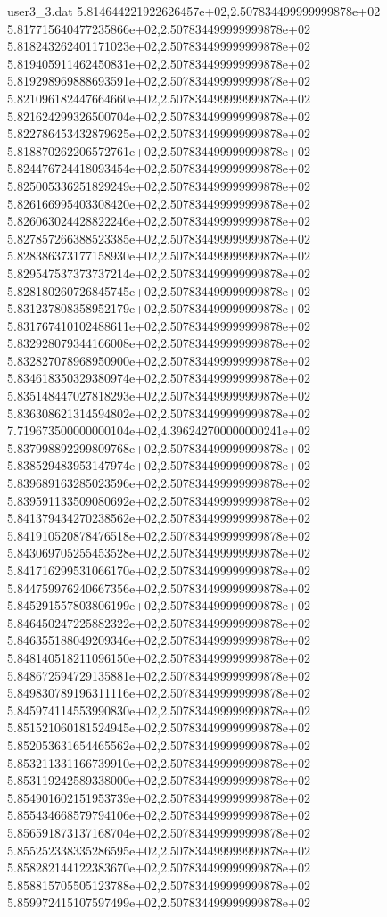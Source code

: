\begin{filecontents}{user3_3.dat}
5.814644221922626457e+02,2.507834499999999878e+02
5.817715640477235866e+02,2.507834499999999878e+02
5.818243262401171023e+02,2.507834499999999878e+02
5.819405911462450831e+02,2.507834499999999878e+02
5.819298969888693591e+02,2.507834499999999878e+02
5.821096182447664660e+02,2.507834499999999878e+02
5.821624299326500704e+02,2.507834499999999878e+02
5.822786453432879625e+02,2.507834499999999878e+02
5.818870262206572761e+02,2.507834499999999878e+02
5.824476724418093454e+02,2.507834499999999878e+02
5.825005336251829249e+02,2.507834499999999878e+02
5.826166995403308420e+02,2.507834499999999878e+02
5.826063024428822246e+02,2.507834499999999878e+02
5.827857266388523385e+02,2.507834499999999878e+02
5.828386373177158930e+02,2.507834499999999878e+02
5.829547537373737214e+02,2.507834499999999878e+02
5.828180260726845745e+02,2.507834499999999878e+02
5.831237808358952179e+02,2.507834499999999878e+02
5.831767410102488611e+02,2.507834499999999878e+02
5.832928079344166008e+02,2.507834499999999878e+02
5.832827078968950900e+02,2.507834499999999878e+02
5.834618350329380974e+02,2.507834499999999878e+02
5.835148447027818293e+02,2.507834499999999878e+02
5.836308621314594802e+02,2.507834499999999878e+02
7.719673500000000104e+02,4.396242700000000241e+02
5.837998892299809768e+02,2.507834499999999878e+02
5.838529483953147974e+02,2.507834499999999878e+02
5.839689163285023596e+02,2.507834499999999878e+02
5.839591133509080692e+02,2.507834499999999878e+02
5.841379434270238562e+02,2.507834499999999878e+02
5.841910520878476518e+02,2.507834499999999878e+02
5.843069705255453528e+02,2.507834499999999878e+02
5.841716299531066170e+02,2.507834499999999878e+02
5.844759976240667356e+02,2.507834499999999878e+02
5.845291557803806199e+02,2.507834499999999878e+02
5.846450247225882322e+02,2.507834499999999878e+02
5.846355188049209346e+02,2.507834499999999878e+02
5.848140518211096150e+02,2.507834499999999878e+02
5.848672594729135881e+02,2.507834499999999878e+02
5.849830789196311116e+02,2.507834499999999878e+02
5.845974114553990830e+02,2.507834499999999878e+02
5.851521060181524945e+02,2.507834499999999878e+02
5.852053631654465562e+02,2.507834499999999878e+02
5.853211331166739910e+02,2.507834499999999878e+02
5.853119242589338000e+02,2.507834499999999878e+02
5.854901602151953739e+02,2.507834499999999878e+02
5.855434668579794106e+02,2.507834499999999878e+02
5.856591873137168704e+02,2.507834499999999878e+02
5.855252338335286595e+02,2.507834499999999878e+02
5.858282144122383670e+02,2.507834499999999878e+02
5.858815705505123788e+02,2.507834499999999878e+02
5.859972415107597499e+02,2.507834499999999878e+02

\end{filecontents}
